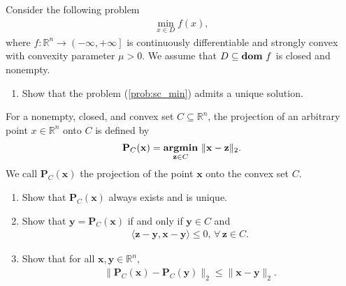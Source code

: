 \documentclass[11pt,letter,notitlepage]{article}
\DeclareMathOperator*{\argmin}{\bf argmin}
\DeclareMathOperator*{\dom}{\bf dom\,}
\newcommand{\proj}[2]{\textbf{P}_{#2} (#1)}
\begin{document}
\newpage

\begin{exercise}
    Consider the following problem 
    \begin{align}\label{prob:sc_min}
        \min_{x\in D}f(x),
    \end{align}
    where $f:\mathbb{R}^{n} \to \left( -\infty,+\infty \right]$ is continuously differentiable and strongly convex with convexity parameter $\mu>0$. We assume that $D \subseteq \dom f $ is closed and nonempty.
    \begin{enumerate}
        \item Show that the problem (\ref{prob:sc_min}) admits a unique solution.
    \end{enumerate}
	For a nonempty, closed, and convex set $C\subseteq\mathbb{R}^n$, the projection of an arbitrary point $x\in\mathbb{R}^n$ onto $C$ is defined by
	\begin{align*}
	    \proj{\mathbf{x}}{C} = \argmin_{\mathbf{z}\in C}\,\|\mathbf{x}-\mathbf{z}\|_2.
	\end{align*}
    We call $\proj{\mathbf{x}}{C}$ the projection of the point $\mathbf{x}$ onto the convex set $C$. 
    \begin{enumerate}[resume]
        \item Show that $\proj{\mathbf{x}}{C}$ always exists and is unique.
        \item Show that $\mathbf{y}=\proj{\mathbf{x}}{C}$ if and only if $\mathbf{y}\in C$ and 
    		\begin{align*}
    		\langle \mathbf{z}-\mathbf{y}, \mathbf{x}-\mathbf{y}\rangle\leq0,\,\forall\,\mathbf{z}\in C.
    		\end{align*}
    	\item Show that for all $\mathbf{x},\mathbf{y}\in\mathbb{R}^n$,
    	\begin{align*}
    		\|\proj{\mathbf{x}}{C}-\proj{\mathbf{y}}{C}\|_2\leq \|\mathbf{x}-\mathbf{y}\|_2.
    	\end{align*}
    \end{enumerate}
\end{exercise}
\begin{solution}

\end{solution}

\newpage
\end{document}
